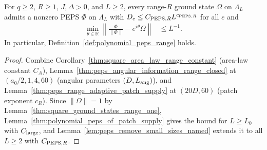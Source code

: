 \begin{corollary}
    \label{thm:polynomial_peps_range_explicit_constants}
    \leanok
    For $q\ge2$, $R\ge1$, $J,\Delta>0$, and $L\ge2$,
    every range-$R$ ground state $\Omega$ on $\Lambda_L$ admits a
    nonzero PEPS $\Phi$ on $\Lambda_L$ with
    $D_e\le C_{{\rm PEPS},R}L^{c_{{\rm PEPS},R}}$ for all $e$ and
    \begin{align}
        \min_{\theta\in\mathbb R}
        \left\|\frac{\Phi}{\|\Phi\|}-e^{i\theta}\Omega\right\| & \le L^{-1}.
        \label{eq:polynomial_peps_range_error}
    \end{align}
    In particular, Definition~\ref{def:polynomial_peps_range} holds.
\end{corollary}
\begin{proof}
    \leanok
    Combine Corollary~\ref{thm:square_area_law_range_constant} (area-law constant $C_A$), Lemma~\ref{thm:peps_angular_information_range_closed} at $(a_0/2,1,4,60)$ (angular parameters $(D,L_{\rm ang})$), and Lemma~\ref{thm:peps_range_adaptive_patch_supply} at $(20D,60)$ (patch exponent $c_R$). Since $\|\Omega\|=1$ by Lemma~\ref{thm:square_ground_states_range_one}, Lemma~\ref{thm:polynomial_peps_of_patch_supply} gives the bound for $L\ge L_0$ with $C_{\rm large}$, and Lemma~\ref{lem:peps_remove_small_sizes_named} extends it to all $L\ge2$ with $C_{{\rm PEPS},R}$.
\end{proof}

